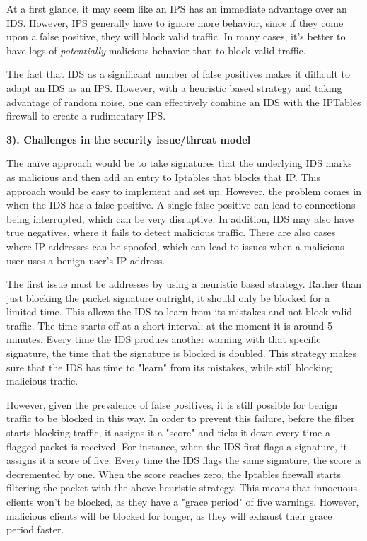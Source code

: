 \documentclass[12pt]{article}
\begin{document}
\begin{flushleft}
\begin{multicols}{2}
At a first glance, it may seem like an IPS has an immediate advantage over an IDS. However, IPS generally have to ignore more behavior, since if they come upon a false positive, they will block valid traffic. In many cases, it's better to have logs of \textit{potentially} malicious behavior than to block valid traffic. 

The fact that IDS as a significant number of false positives makes it difficult to adapt an IDS as an IPS. However, with a heuristic based strategy and taking advantage of random noise, one can effectively combine an IDS with the IPTables firewall to create a rudimentary IPS.

\textbf{3). Challenges in the security issue/threat model}

The na\"{i}ve approach would be to take signatures that the underlying IDS marks as malicious and then add an entry to Iptables that blocks that IP. This approach would be easy to implement and set up. However, the problem comes in when the IDS has a false positive. A single false positive can lead to connections being interrupted, which can be very disruptive. In addition, IDS may also have true negatives, where it fails to detect malicious traffic. There are also cases where IP addresses can be spoofed, which can lead to issues when a malicious user uses a benign user's IP address.

The first issue must be addresses by using a heuristic based strategy. Rather than just blocking the packet signature outright, it should only be blocked for a limited time. This allows the IDS to learn from its mistakes and not block valid traffic. The time starts off at a short interval; at the moment it is around 5 minutes. Every time the IDS produes another warning with that specific signature, the time that the signature is blocked is doubled. This strategy makes sure that the IDS has time to "learn" from its mistakes, while still blocking malicious traffic.

However, given the prevalence of false positives, it is still possible for benign traffic to be blocked in this way. In order to prevent this failure, before the filter starts blocking traffic, it assigns it a "score" and ticks it down every time a flagged packet is received. For instance, when the IDS first flags a signature, it assigns it a score of five. Every time the IDS flags the same signature, the score is decremented by one. When the score reaches zero, the Iptables firewall starts filtering the packet with the above heuristic strategy. This means that innocuous clients won't be blocked, as they have a "grace period" of five warnings. However, malicious clients will be blocked for longer, as they will exhaust their grace period faster.


\end{multicols}
\end{flushleft}
\end{document}
